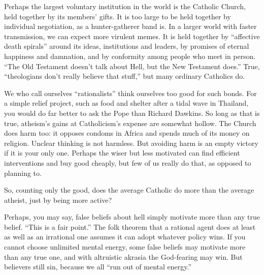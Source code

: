 
Perhaps the largest voluntary institution in the world is the Catholic Church, held together by its members' gifts. It is too large to be held together by individual negotiation, as a hunter-gatherer band is. In a larger world with faster transmission, we can expect more virulent memes. It is held together by ``affective death spirals'' around its ideas, institutions and leaders, by promises of eternal happiness and damnation, and by conformity among people who meet in person. ``The Old Testament doesn't talk about Hell, but the New Testament does.''  True, ``theologians don't really believe that stuff,'' but many ordinary Catholics do. 

We who call ourselves ``rationalists'' think ourselves too good for such bonds. For a simple relief project, such as food and shelter after a tidal wave in Thailand, you would do far better to ask the Pope than Richard Dawkins. So long as that is true, atheism's gains at Catholicism's expense are somewhat hollow. The Church does harm too: it opposes condoms in Africa and spends much of its money on religion.  Unclear thinking is not harmless. But avoiding harm is an empty victory if it is your only one. Perhaps the wiser but less motivated can find efficient interventions and buy good cheaply, but few of us really do that, as opposed to planning to.

So, counting only the good, does the average Catholic do more than the average atheist, just by being more active? 

Perhaps, you may say, false beliefs about hell simply motivate more than any true belief. ``This is a fair point.'' The folk theorem that a rational agent does at least as well as an irrational one assumes it can adopt whatever policy wins. If you cannot choose unlimited mental energy, some false beliefs may motivate more than any true one, and with altruistic akrasia the God-fearing may win. But believers still sin, because we all ``run out of mental energy.'' 

